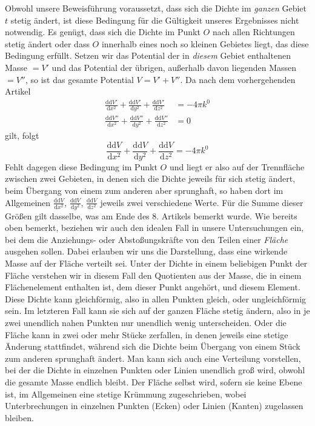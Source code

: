 Obwohl unsere Beweisführung voraussetzt, dass sich die Dichte im \textit{ganzen} Gebiet $t$ stetig ändert, ist diese Bedingung für die Gültigkeit unseres Ergebnisses nicht notwendig. Es genügt, dass sich die Dichte im Punkt $O$ nach allen Richtungen stetig ändert oder dass $O$ innerhalb eines noch so kleinen Gebietes liegt, das diese Bedingung erfüllt. Setzen wir das Potential der in \textit{diesem} Gebiet enthaltenen Masse $=V'$ und das Potential der übrigen, außerhalb davon liegenden Massen $=V''$, so ist das gesamte Potential $V=V'+V''$. Da nach dem vorhergehenden Artikel
\[
\begin{aligned}
\frac{\mathrm{d}\mathrm{d}V'}{\mathrm{d}x^2}+\frac{\mathrm{d}\mathrm{d}V'}{\mathrm{d}y^2}+\frac{\mathrm{d}\mathrm{d}V'}{\mathrm{d}z^2}&=-4\pi k^0\\
\frac{\mathrm{d}\mathrm{d}V''}{\mathrm{d}x^2}+\frac{\mathrm{d}\mathrm{d}V''}{\mathrm{d}y^2}+\frac{\mathrm{d}\mathrm{d}V''}{\mathrm{d}z^2}&=0
\end{aligned}
\]
gilt, folgt
\[
\frac{\mathrm{d}\mathrm{d}V}{\mathrm{d}x^2}+\frac{\mathrm{d}\mathrm{d}V}{\mathrm{d}y^2}+\frac{\mathrm{d}\mathrm{d}V}{\mathrm{d}z^2}=-4\pi k^0
\]
Fehlt dagegen diese Bedingung im Punkt $O$ und liegt er also auf der Trennfläche zwischen zwei Gebieten, in denen sich die Dichte jeweils für sich stetig ändert, beim Übergang von einem zum anderen aber sprunghaft, so haben dort im Allgemeinen $\frac{\mathrm{d}\mathrm{d}V}{\mathrm{d}x^2}$, $\frac{\mathrm{d}\mathrm{d}V}{\mathrm{d}y^2}$, $\frac{\mathrm{d}\mathrm{d}V}{\mathrm{d}z^2}$ jeweils zwei verschiedene Werte. Für die Summe dieser Größen gilt dasselbe, was am Ende des 8. Artikels bemerkt wurde.
%
Wie bereits oben bemerkt, beziehen wir auch den idealen Fall in unsere Untersuchungen ein, bei dem die Anziehungs- oder Abstoßungskräfte von den Teilen einer \textit{Fläche} ausgehen sollen. Dabei erlauben wir uns die Darstellung, dass eine wirkende Masse auf der Fläche verteilt sei. Unter der Dichte in einem beliebigen Punkt der Fläche verstehen wir in diesem Fall den Quotienten aus der Masse, die in einem Flächenelement enthalten ist, dem dieser Punkt angehört, und diesem Element. Diese Dichte kann gleichförmig, also in allen Punkten gleich, oder ungleichförmig sein. Im letzteren Fall kann sie sich auf der ganzen Fläche stetig ändern, also in je zwei unendlich nahen Punkten nur unendlich wenig unterscheiden. Oder die Fläche kann in zwei oder mehr Stücke zerfallen, in denen jeweils eine stetige Änderung stattfindet, während sich die Dichte beim Übergang von einem Stück zum anderen sprunghaft ändert. Man kann sich auch eine Verteilung vorstellen, bei der die Dichte in einzelnen Punkten oder Linien unendlich groß wird, obwohl die gesamte Masse endlich bleibt. Der Fläche selbst wird, sofern sie keine Ebene ist, im Allgemeinen eine stetige Krümmung zugeschrieben, wobei Unterbrechungen in einzelnen Punkten (Ecken) oder Linien (Kanten) zugelassen bleiben.

